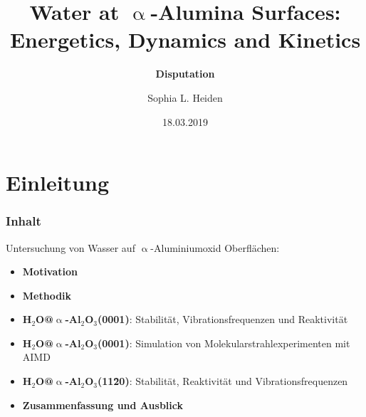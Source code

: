 \documentclass[hyperref={pdfpagelabels=false}]{beamer}
\begin{document}
\title{Water at $\upalpha$-Alumina Surfaces: Energetics, Dynamics and Kinetics}
\subtitle{{\bf Disputation}}   
\author{Sophia L. Heiden}
\date{18.03.2019}

\begin{frame}[plain]
 \addtocounter{framenumber}{-2}
\titlepage
\end{frame} 

\section[]{Einleitung}
\begin{frame}[plain]
\frametitle{Inhalt}
 Untersuchung von Wasser auf $\upalpha$-Aluminiumoxid Oberflächen: \newline 
\begin{itemize}
 \item \textbf{Motivation}
 \item \textbf{Methodik}
 \item \textbf{H$_2$O@$\upalpha$-Al$_2$O$_3$(0001)}: Stabilität, Vibrationsfrequenzen und Reaktivität
 \item \textbf{H$_2$O@$\upalpha$-Al$_2$O$_3$(0001)}: Simulation von Molekularstrahlexperimenten mit AIMD
 \item \textbf{H$_2$O@$\upalpha$-Al$_2$O$_3$(11\=20)}: Stabilität, Reaktivität und Vibrationsfrequenzen
 \item \textbf{Zusammenfassung und Ausblick}
 \end{itemize}
\end{frame}
\end{document}
